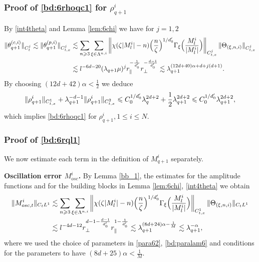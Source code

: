 \documentclass[UTF-8,reqno]{amsart}
\numberwithin{equation}{section}
\theoremstyle{definition}
\def\({{\Big(}}
\def\){{\Big)}}
\newcommand{\norm}[1]{\left\|#1\right\|}
\def\geq{\geqslant}
\def\leq{\leqslant}
\def\({{\Big(}}
\def\){{\Big)}}
\def\geq{\geqslant}
\def\leq{\leqslant}
\begin{document}
\subsubsection{Proof of  \eqref{bd:6rhoqc1} for $\rho^{i}_{q+1}$}
  By \eqref{int4theta} and Lemma \ref{lem:6chi} we have for $j=1,2$
\begin{align*}
\|\theta_{q+1}^{(c,i)}\|_{C_{t}^j}\lesssim\|\theta_{q+1}^{(p,i)} \|_{C_{t,x}^j} 
&\lesssim\sum_{n\geq3}\sum_{\xi\in\Lambda^{n,i}}\norm{\chi(\zeta|M^{i}_l|-n)\(\frac{n}{\zeta}\)^{1/d_0'}\Gamma_{\xi}\(\frac{M^{i}_l}{|M^{i}_l|}\)}_{C_{t,x}^j}\|\Theta_{(\xi,n,i)} \|_{C_{t,x}^j} \notag\\ 
&\lesssim l^{-6d-20}(\lambda_{q+1}\mu)^j r_\parallel^{-\frac{1}{d_0'}}r_\perp^{-\frac{d-1}{d_0'}} \lesssim \lambda_{q+1}^{(12d+40)\alpha+d+j(d+1)}.\notag
\end{align*}
By choosing $(12d+42)\alpha<\frac{1}{2}$ we deduce 
\begin{align}
    \|\rho^{i}_{q+1} \|_{C_{t,x}^1}+\lambda_{q+1}^{-d-1}\|\rho^{i}_{q+1}\|_{C_{t,x}^2}%
    \leq C_0^{1/d_0'}\lambda_{q}^{2d+2}+ \frac12\lambda_{q+1}^{2d+2}\leq C_0^{1/d_0'}\lambda_{q+1}^{2d+2},\notag
\end{align}
which implies  \eqref{bd:6rhoqc1} for $\rho^{i}_{q+1},1\leq i\leq N$.  

\subsubsection{Proof of  \eqref{bd:6rql1} }  We now estimate each term in the definition of $M_{q+1}^i$ separately.

 
\textbf{Oscillation error $M^{i}_{osc}$.} By Lemma \ref{bb_1}, the estimates for the amplitude functions and for the building blocks in  Lemma \ref{lem:6chi}, \eqref{int4theta}    we obtain
\begin{align}
    \|M^{i}_{osc,t}\|_{C_tL^1}
    &\lesssim \sum_{n\geq3}\sum_{\xi\in\Lambda^{n,i}}\norm{\chi(\zeta|M^{i}_l|-n)\(\frac{n}{\zeta}\)^{1/d_0'}\Gamma_{\xi}\(\frac{M^{i}_l}{|M^{i}_l|}\)}_{C_{t,x}^1} \|\Theta_{(\xi,n,i)}\|_{C_tL^1}\notag\\
    &\lesssim l^{-4d-12}r_\perp^{d-1-\frac{d-1}{d_0'}}r_\parallel^{1-\frac{1}{d_0'}} \lesssim \lambda_{q+1}^{(8d+24)\alpha-\frac 1{M}}\lesssim  \lambda_{q+1}^{-\alpha},\notag
\end{align}
where we used the choice of parameters in 
\eqref{para62},  \eqref{bd:paralam6} and  conditions for the parameters to have $(8d+25)\alpha<\frac 1{M}$.
\end{document}
